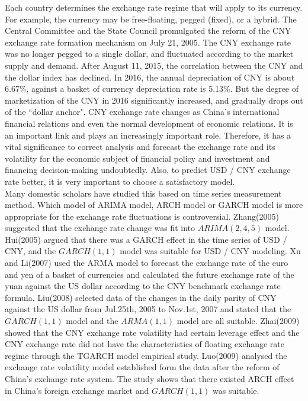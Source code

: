 \documentclass[12pt, a4paper, titlepage]{article}
\begin{document}
Each country determines the exchange rate regime that will apply to its currency. For example, the currency may be free-floating, pegged (fixed), or a hybrid. The Central Committee and the State Council promulgated the reform of the CNY exchange rate formation mechanism on July 21, 2005. The CNY exchange rate was no longer pegged to a single dollar, and fluctuated according to the market supply and demand. After August 11, 2015, the correlation between the CNY and the dollar index has declined. In 2016, the annual depreciation of CNY is about 6.67\%, against a basket of currency depreciation rate is 5.13\%. But the degree of marketization of the CNY in 2016 significantly increased, and gradually drops out of the ``dollar anchor". CNY exchange rate changes as China's international financial relations and even the normal development of economic relations. It is an important link and plays an increasingly important role. Therefore, it has a vital significance to correct analysis and forecast the exchange rate and its volatility for the economic subject of financial policy and investment and financing decision-making undoubtedly. Also, to predict USD / CNY exchange rate better, it is very important to choose a satisfactory model.\\

Many domestic scholars have studied this based on time series measurement method. Which model of ARIMA model, ARCH model or GARCH model is more appropriate for the exchange rate fluctuations is controversial. Zhang(2005) suggested that the exchange rate change was fit into $ARIMA(2,4,5)$ model. Hui(2005) argued that there was a GARCH effect in the time series of USD / CNY, and the $GARCH(1,1)$ model was suitable for USD / CNY modeling. Xu and Li(2007) used the ARMA model to forecast the exchange rate of the euro and yen of a basket of currencies and calculated the future exchange rate of the yuan against the US dollar according to the CNY benchmark exchange rate formula. Liu(2008) selected data of the changes in the daily parity of CNY against the US dollar from Jul.25th, 2005 to Nov.1st, 2007 and stated that the $GARCH(1,1)$ model and the $ARMA(1,1)$ model are all suitable. Zhai(2009) showed that the CNY exchange rate volatility had certain leverage effect and the CNY exchange rate did not have the characteristics of floating exchange rate regime through the TGARCH model empirical study. Luo(2009) analysed the exchange rate volatility model established form the data after the reform of China's exchange rate system. The study shows that there existed ARCH effect in China's foreign exchange market and $GARCH(1,1)$ was suitable.\\
\end{document}
